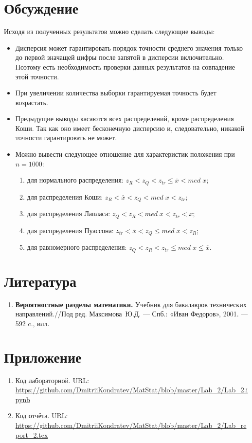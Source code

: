 \documentclass[12pt,a4paper]{article}
\begin{document}
	\section{Обсуждение}
	Исходя из полученных результатов можно сделать следующие выводы:
	\begin{itemize}
		\item Дисперсия может гарантировать порядок точности среднего значения только до первой значащей цифры после запятой в дисперсии включительно. Поэтому есть необходимость проверки данных результатов на совпадение этой точности.
		
		\item При увеличении количества выборки гарантируемая точность будет возрастать.
		
		\item Предыдущие выводы касаются всех распределений, кроме распределения Коши. Так как оно имеет бесконечную дисперсию и, следовательно, никакой точности гарантировать не может.
		
		\newpage
		\item Можно вывести следующее отношение для характеристик положения при $n=1000$:
		\begin{enumerate}
			\item для нормального распределения: $z_R < z_Q < z_{tr} \leq \overline{x} < med\;x$;
			
			\item для распределения Коши: $z_R < \overline{x} < z_Q < med\;x < z_{tr}$;
			
			\item для распределения Лапласа: $z_Q < z_R < med\;x < z_{tr} < \overline{x}$;
			
			\item для распределения Пуассона: $ z_{tr} < \overline{x} < z_Q \leq med\;x < z_R$;
			
			\item для равномерного распределения: $z_Q < z_R < z_{tr} \leq med\;x \leq \overline{x}$.
		\end{enumerate}
	\end{itemize}
	
	\section{Литература}
	\begin{enumerate}
		\item \label{Book_1} \textbf{Вероятностные разделы математики.} Учебник для бакалавров технических направлений.//Под ред. Максимова~Ю.Д. --- Спб.: «Иван Федоров», 2001. --- 592 c., илл.
	\end{enumerate}

	\section{Приложение}
	\begin{enumerate}
		\item Код лабораторной. URL: \url{https://github.com/DmitriiKondratev/MatStat/blob/master/Lab_2/Lab_2.ipynb}
		
		\item Код отчёта. URL: \url{https://github.com/DmitriiKondratev/MatStat/blob/master/Lab_2/Lab_report_2.tex}
		
	\end{enumerate}
\end{document}
